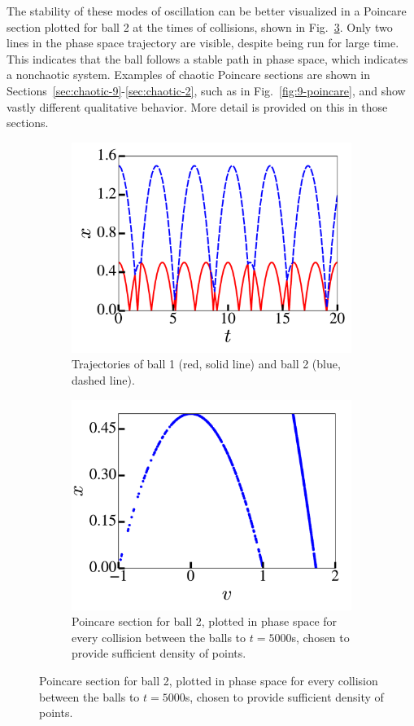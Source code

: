 \documentclass[pra,twocolumn,showpacs,amsmath,amssymb, aps, 10pt]{revtex4-1}
\begin{document}
The stability of these
modes of oscillation can be better visualized in a Poincare section plotted
for ball 2 at the times of collisions, shown in
Fig.~\ref{fig:1-poincare}. Only two lines in the phase space trajectory
are visible, despite being run for large time.
This indicates that the ball follows a stable path in phase space, which
indicates a nonchaotic system. Examples of chaotic Poincare sections are
shown in Sections~\ref{sec:chaotic-9}-\ref{sec:chaotic-2}, such as in
Fig.~\ref{fig:9-poincare}, and show vastly different qualitative
behavior. More detail is provided on this in those sections.

\begin{figure}
  \begin{subfigure}{0.8\linewidth}
    \includegraphics[width=\linewidth]{r1_0_traj}
    \caption{Trajectories of ball 1 (red, solid line) and ball 2 (blue, dashed line).}
    \label{fig:1-traj}
  \end{subfigure}

  \begin{subfigure}{0.8\linewidth}
    \includegraphics[width=\linewidth]{r1_0_poincare}
    \caption{Poincare section for ball 2,  plotted in phase space for every collision
    between the balls to $t=5000$s, chosen to provide sufficient density of points.}
    \label{fig:1-poincare}
  \end{subfigure}


\end{figure}
\end{document}

